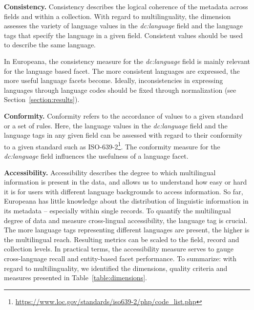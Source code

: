 \noindent \textbf{Consistency.}
Consistency describes the logical coherence of the metadata across fields and within a collection. With regard to multilinguality, the dimension assesses the variety of language values in the \textit{dc:language} field and the language tags that specify the language in a given field. Consistent values should be used to describe the same language.

In Europeana, the consistency measure for the \textit{dc:language} field is mainly relevant for the language based facet. The more consistent languages are expressed, the more useful language facets become. Ideally, inconsistencies in expressing languages through language codes should be fixed through normalization (see Section~\ref{section:results}).

\noindent \textbf{Conformity.}
Conformity refers to the accordance of values to a given standard or a set of rules. Here, the language values in the \textit{dc:language} field and the language tags in any given field can be assessed with regard to their conformity to a given standard such as ISO-639-2\footnote{ \url{https://www.loc.gov/standards/iso639-2/php/code_list.php}}.
The conformity measure for the \textit{dc:language} field influences the usefulness of a language facet. 

\noindent\textbf{Accessibility.}
Accessibility describes the degree to which multilingual information is present in the data, and allows us to understand how easy or hard it is for users with different language backgrounds to access information. So far, Europeana has little knowledge about the distribution of linguistic information in its metadata -- especially within single records. To quantify the multilingual degree of data and measure cross-lingual accessibility, the language tag is crucial. The more language tags representing different languages are present, the higher is the multilingual reach. Resulting metrics can be scaled to the field, record and collection levels. In practical terms, the accessibility measure serves to gauge cross-language recall and entity-based facet performance.
To summarize: with regard to multilinguality, we identified the dimensions, quality criteria and measures presented in Table~\ref{table:dimensions}.

